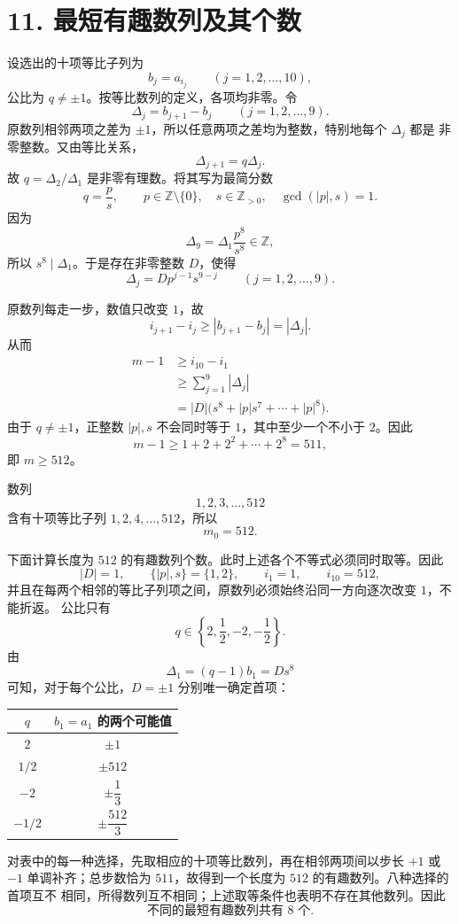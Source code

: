 \documentclass[UTF8,11pt]{ctexart}
\newcommand{\ans}[1]{\boxed{#1}}
\begin{document}
\section*{11. 最短有趣数列及其个数}

设选出的十项等比子列为
\[
  b_j=a_{i_j}\qquad (j=1,2,\ldots,10),
\]
公比为 $q\ne\pm1$。按等比数列的定义，各项均非零。令
\[
  \Delta_j=b_{j+1}-b_j\qquad(j=1,2,\ldots,9).
\]
原数列相邻两项之差为 $\pm1$，所以任意两项之差均为整数，特别地每个 $\Delta_j$ 都是
非零整数。又由等比关系，
\[
  \Delta_{j+1}=q\Delta_j.
\]
故 $q=\Delta_2/\Delta_1$ 是非零有理数。将其写为最简分数
\[
  q=\frac ps,\qquad p\in\mathbb Z\setminus\{0\},\quad
  s\in\mathbb Z_{>0},\quad \gcd(|p|,s)=1.
\]
因为
\[
  \Delta_9=\Delta_1\frac{p^8}{s^8}\in\mathbb Z,
\]
所以 $s^8\mid\Delta_1$。于是存在非零整数 $D$，使得
\[
  \Delta_j=Dp^{j-1}s^{9-j}\qquad(j=1,2,\ldots,9).
\]

原数列每走一步，数值只改变 $1$，故
\[
  i_{j+1}-i_j\geqslant|b_{j+1}-b_j|=|\Delta_j|.
\]
从而
\[
\begin{aligned}
  m-1&\geqslant i_{10}-i_1\\
     &\geqslant\sum_{j=1}^9|\Delta_j|\\
     &=|D|\bigl(s^8+|p|s^7+\cdots+|p|^8\bigr).
\end{aligned}
\]
由于 $q\ne\pm1$，正整数 $|p|,s$ 不会同时等于 $1$，其中至少一个不小于 $2$。因此
\[
  m-1\geqslant1+2+2^2+\cdots+2^8=511,
\]
即 $m\geqslant512$。

数列
\[
  1,2,3,\ldots,512
\]
含有十项等比子列 $1,2,4,\ldots,512$，所以
\[
  \ans{m_0=512}.
\]

下面计算长度为 $512$ 的有趣数列个数。此时上述各个不等式必须同时取等。因此
\[
  |D|=1,\qquad \{|p|,s\}=\{1,2\},\qquad i_1=1,\qquad i_{10}=512,
\]
并且在每两个相邻的等比子列项之间，原数列必须始终沿同一方向逐次改变 $1$，不能折返。
公比只有
\[
  q\in\left\{2,\frac12,-2,-\frac12\right\}.
\]
由
\[
  \Delta_1=(q-1)b_1=Ds^8
\]
可知，对于每个公比，$D=\pm1$ 分别唯一确定首项：

\begin{center}
\renewcommand{\arraystretch}{1.35}
\begin{tabular}{c c}
\toprule
$q$ & $b_1=a_1$ 的两个可能值\\
\midrule
$2$ & $\pm1$\\
$1/2$ & $\pm512$\\
$-2$ & $\pm\dfrac13$\\
$-1/2$ & $\pm\dfrac{512}{3}$\\
\bottomrule
\end{tabular}
\end{center}

对表中的每一种选择，先取相应的十项等比数列，再在相邻两项间以步长 $+1$ 或 $-1$
单调补齐；总步数恰为 $511$，故得到一个长度为 $512$ 的有趣数列。八种选择的首项互不
相同，所得数列互不相同；上述取等条件也表明不存在其他数列。因此
\[
  \ans{\text{不同的最短有趣数列共有 }8\text{ 个}}.
\]
\end{document}
